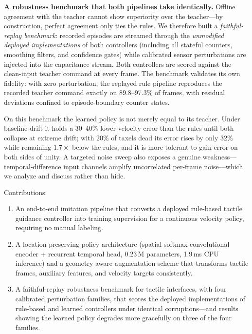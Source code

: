 \documentclass[runningheads]{llncs}
\begin{document}
\textbf{A robustness benchmark that both pipelines take identically.}
Offline agreement with the teacher cannot show superiority over the
teacher---by construction, perfect agreement only ties the rules.  We
therefore built a \emph{faithful-replay benchmark}: recorded episodes are
streamed through the \emph{unmodified deployed implementations} of both
controllers (including all stateful counters, smoothing filters, and
confidence gates) while calibrated sensor perturbations are injected into
the capacitance stream.  Both controllers are scored against the
clean-input teacher command at every frame.  The benchmark validates its
own fidelity: with zero perturbation, the replayed rule pipeline
reproduces the recorded teacher command exactly on 89.8--97.3\% of frames,
with residual deviations confined to episode-boundary counter states.

On this benchmark the learned policy is not merely equal to its teacher.
Under baseline drift it holds a 30--40\% lower velocity error than the
rules until both collapse at extreme drift; with 20\% of taxels dead its
error rises by only 32\% while remaining $1.7\times$ below the rules; and
it is more tolerant to gain error on both sides of unity.  A targeted
noise sweep also exposes a genuine weakness---temporal-difference input
channels amplify uncorrelated per-frame noise---which we analyze and
discuss rather than hide.

Contributions:
\begin{enumerate}
  \item An end-to-end imitation pipeline that converts a deployed
  rule-based tactile guidance controller into training supervision for a
  continuous velocity policy, requiring no manual labeling.
  \item A location-preserving policy architecture (spatial-softmax
  convolutional encoder + recurrent temporal head, 0.23\,M parameters,
  1.9\,ms CPU inference) and a geometry-aware augmentation scheme that
  transforms tactile frames, auxiliary features, and velocity targets
  consistently.
  \item A faithful-replay robustness benchmark for tactile interfaces,
  with four calibrated perturbation families, that scores the deployed
  implementations of rule-based and learned controllers under identical
  corruptions---and results showing the learned policy degrades more
  gracefully on three of the four families.
\end{enumerate}

\end{document}
